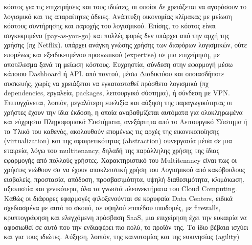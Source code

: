\documentclass{article}
\begin{document}
\begin{itemize}
     κόστος για τις επιχειρήσεις και τους ιδιώτες, οι οποίοι δε χρειάζεται να αγοράσουν το λογισμικό και τις απαραίτητες άδειες. Ανάπτυξη οικονομίας κλίμακας με μείωση κόστους συντήρησης και παροχής του λογισμικού. Επίσης, το κόστος είναι συγκεκριμένο (pay-as-you-go) και πολλές φορές δεν υπάρχει από την αρχή της χρήσης (πχ Netflix). 
     υπάρχει ανάγκη γνώσης χρήσης των διαφόρων λογισμικών, ούτε επομένως και εξειδικευμένου προσωπικού  (expertise)  σε μια επιχείρηση, με αποτέλεσμα ξανά τη μείωση κόστους. Ευχρηστία, σύνδεση στην εφαρμογή μέσω κάποιου Dashboard ή API.
     από παντού, μέσω Διαδικτύου και οποιασδήποτε συσκευής, χωρίς να χρειάζεται να εγκατασταθεί πρόσθετο λογισμικό (πχ dependencies, εργαλεία, packages, λειτουργικό σύστημα), ή σύνδεση με VPN. Επιτυγχάνεται, λοιπόν, μεγαλύτερη ευελιξία και αύξηση της παραγωγικότητας 
     οι χρήστες έχουν την ίδια έκδοση, η οποία αναβαθμίζεται αυτόματα
     για ολοκληρωμένα και εύχρηστα Πληροφοριακά Συστήματα, ανεξάρτητα από το Λειτουργικό Σύστημα ή το Υλικό του καθενός, ακολουθούν επομένως τις αρχές της εικονικοποίησης (virtualization) και της αφαιρετικότητας (abstraction)
     συνεργασία μέσα σε μια εταιρεία, λόγω του multitenancy, δηλαδή της παράλληλης χρήσης της ίδιας εφαρμογής από πολλούς χρήστες. Χαρακτηριστικό του Multitenancy είναι πως οι χρήστες νιώθουν σα να έχουν αποκλειστική χρήση του Λογισμικού
     από κακόβουλους εισβολείς, προστασία, απόδοση, προσβασιμότητα, υψηλή διαθεσιμότητα, κλιμάκωση, αξιοπιστία και γενικότερα, όλα τα γνωστά πλεονεκτήματα του Cloud Computing. Καθώς οι διάφορες εφαρμογές φιλοξενούνται σε κορυφαία Data Centers, ειδικά σχεδιασμένα με αυτό το σκοπό, σε υψηλού επιπέδου υποδομές, με firewalls, κρυπτογράφηση και ελεγχόμενη πρόσβαση
     SaaS, μια επιχείρηση έχει την ευκαιρία να αφοσιωθεί σε αυτό που την ενδιαφέρει πιο πολύ, το προϊόν της. Το ίδιο βέβαια ισχύει και για τους ιδιώτες. Αύξηση, λοιπόν, της καινοτομίας και της ευκινησίας (agility)
\end{itemize}
\end{document}
